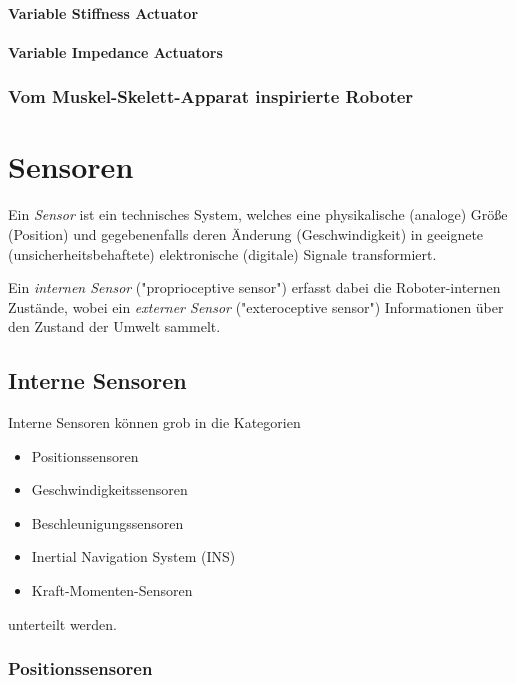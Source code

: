 			\subsubsection{Variable Stiffness Actuator} %

			\subsubsection{Variable Impedance Actuators} %

		\subsection{Vom Muskel-Skelett-Apparat inspirierte Roboter} %

\chapter{Sensoren}
	Ein \emph{Sensor} ist ein technisches System, welches eine physikalische (analoge) Größe (\zB Position) und gegebenenfalls deren Änderung (\zB Geschwindigkeit) in geeignete (unsicherheitsbehaftete) elektronische (digitale) Signale transformiert.
	
	Ein \emph{internen Sensor} ("proprioceptive sensor") erfasst dabei die Roboter-internen Zustände, wobei ein \emph{externer Sensor} ("exteroceptive sensor") Informationen über den Zustand der Umwelt sammelt.

	\section{Interne Sensoren}
		Interne Sensoren können grob in die Kategorien
		\begin{itemize}
			\item Positionssensoren
			\item Geschwindigkeitssensoren
			\item Beschleunigungssensoren
			\item Inertial Navigation System (INS)
			\item Kraft-Momenten-Sensoren
		\end{itemize}
		unterteilt werden.

		\subsection{Positionssensoren}
